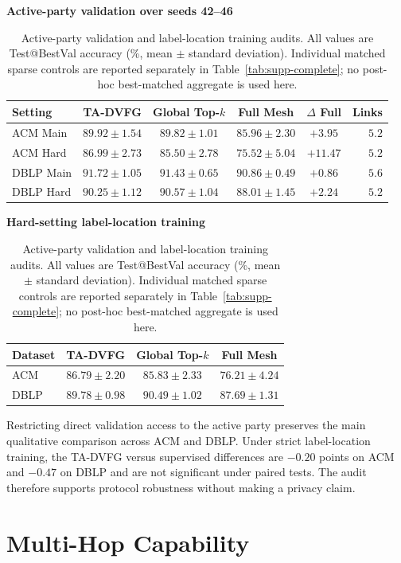 \documentclass[letterpaper]{article}
\newcommand{\method}{\textsc{TA-DVFG}}
\begin{document}
\begin{table}[!t]
\centering
\caption{Active-party validation and label-location training audits. All values
are Test@BestVal accuracy (\%, mean $\pm$ standard deviation). Individual
matched sparse controls are reported separately in Table~\ref{tab:supp-complete};
no post-hoc best-matched aggregate is used here.}
\label{tab:supp-active-label-audits}
\scriptsize
\textbf{Active-party validation over seeds 42--46}\\[2pt]
\begin{tabular}{lccccr}
\toprule
Setting & \method{} & Global Top-$k$ & Full Mesh & $\Delta$ Full & Links \\
\midrule
ACM Main & $89.92\pm1.54$ & $89.82\pm1.01$ & $85.96\pm2.30$ & $+3.95$ & $5.2$ \\
ACM Hard & $86.99\pm2.73$ & $85.50\pm2.78$ & $75.52\pm5.04$ & $+11.47$ & $5.2$ \\
DBLP Main & $91.72\pm1.05$ & $91.43\pm0.65$ & $90.86\pm0.49$ & $+0.86$ & $5.6$ \\
DBLP Hard & $90.25\pm1.12$ & $90.57\pm1.04$ & $88.01\pm1.45$ & $+2.24$ & $5.2$ \\
\bottomrule
\end{tabular}

\vspace{5pt}
\textbf{Hard-setting label-location training}\\[2pt]
\begin{tabular}{lccc}
\toprule
Dataset & \method{} & Global Top-$k$ & Full Mesh \\
\midrule
ACM & $86.79\pm2.20$ & $85.83\pm2.33$ & $76.21\pm4.24$ \\
DBLP & $89.78\pm0.98$ & $90.49\pm1.02$ & $87.69\pm1.31$ \\
\bottomrule
\end{tabular}
\end{table}

Restricting direct validation access to the active party preserves the main
qualitative comparison across ACM and DBLP. Under strict label-location
training, the \method{} versus supervised differences are $-0.20$ points on ACM
and $-0.47$ on DBLP and are not significant under paired tests. The audit
therefore supports protocol robustness without making a privacy claim.

\section{Multi-Hop Capability}
\end{document}
